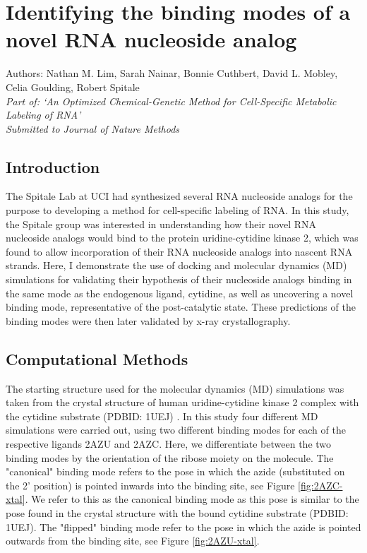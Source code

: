\chapter{Identifying the binding modes of a novel RNA nucleoside analog} \label{UCK2}

\small{Authors: Nathan M. Lim, Sarah Nainar, Bonnie Cuthbert, David L. Mobley, Celia Goulding, Robert Spitale}\\
\emph{Part of: `An Optimized Chemical-Genetic Method for Cell-Specific Metabolic Labeling of RNA' \cite{uck2paper}}\\
\emph{Submitted to Journal of Nature Methods}

\section{Introduction}
The Spitale Lab at UCI had synthesized several RNA nucleoside analogs for the purpose to developing a method for cell-specific labeling of RNA.
In this study, the Spitale group was interested in understanding how their novel RNA nucleoside analogs would bind to the protein uridine-cytidine kinase 2, which was found to allow incorporation of their RNA nucleoside analogs into nascent RNA strands.
Here, I demonstrate the use of docking and molecular dynamics (MD) simulations for validating their hypothesis of their nucleoside analogs binding in the same mode as the endogenous ligand, cytidine, as well as uncovering a novel binding mode, representative of the post-catalytic state.
These predictions of the binding modes were then later validated by x-ray crystallography.

\section{Computational Methods}
The starting structure used for the molecular dynamics (MD) simulations was taken from the crystal structure of human uridine-cytidine kinase 2 complex with the cytidine substrate (PDBID: 1UEJ) \cite{suzuki2004structural}.
In this study four different MD simulations were carried out, using two different binding modes for each of the respective ligands 2AZU and 2AZC.
Here, we differentiate between the two binding modes by the orientation of the ribose moiety on the molecule. 
The "canonical" binding mode refers to the pose in which the azide (substituted on the 2' position) is pointed inwards into the binding site, see Figure \ref{fig:2AZC-xtal}.
We refer to this as the canonical binding mode as this pose is similar to the pose found in the crystal structure with the bound cytidine substrate (PDBID: 1UEJ).
The "flipped" binding mode refer to the pose in which the azide is pointed outwards from the binding site, see Figure \ref{fig:2AZU-xtal}.

